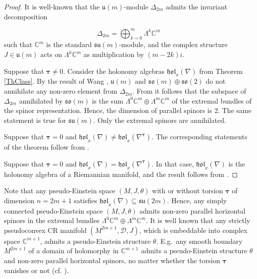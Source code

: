 \documentclass{amsart}
\theoremstyle{plain}
\theoremstyle{definition}
\def\so{\mathfrak{so}}
\def\su{\mathfrak{su}}
\def\u{\mathfrak{u}}
\newcommand{\hol}{\mathfrak{hol}}
\newcommand{\bt}{{\boldsymbol{\tau}}}
\newcommand{\Co}{\mathbb{C}}
\newcommand{\1}{\mathbf{1}}
\newcommand{\+}{\oplus}
\begin{document}
\begin{proof} 
It is well-known that the $\u(m)$-module $\Delta_{2m}$ admits the invariant decomposition 

\begin{equation}\label{Delta2n}\Delta_{2m}=\bigoplus_{k=0}^m\Lambda^k\Co^m\end{equation}
such that $\Co^m$ is the standard $\su(m)$-module, and the complex structure $J\in\u(m)$ acts on $\Lambda^k\Co^m$
as multiplication by $(m-2k)i$.

Suppose that $\bt\neq 0$. Consider the holonomy algebras $\hol_x(\nabla)$  from Theorem \ref{ThClass}. 
By the result of Wang \cite{Wang}, $\u(m)$ and $\so(m)\oplus\so(2)$ do not annihilate any non-zero element from $\Delta_{2m}$. 
From \cite[Lemma 5]{GalHolK} it follows that   the subspace of $\Delta_{2m}$   annihilated by $\so(m)$ is 
the sum $\Lambda^0\Co^m\oplus \Lambda^m\Co^m$ of the extremal bundles of the spinor representation. Hence, the dimension of parallel
spinors is 2. The same statement is true for $\su(m)$. Only the extremal spinors are annihilated. 

Suppose that $\bt=0$ and  $\hol_x(\nabla)\neq\hol_x(\nabla^\bt)$. The corresponding statements of the theorem follow  
from \cite[Theorem 8]{GalHolK}.

Suppose that $\bt=0$ and  $\hol_x(\nabla)=\hol_x(\nabla^\bt)$. In that case,  
$\hol_x(\nabla)$ is the holonomy algebra of  a Riemannian manifold, and the result follows from \cite{Wang}.
\end{proof}



Note that any pseudo-Einstein space $(M,J,\theta)$ with or without torsion 
$\bt$ of dimension $n=2m+1$ satisfies $\hol_x(\nabla)\subseteq \su(2m)$.
Hence, any  simply connected pseudo-Einstein space $(M,J,\theta)$ admits 
non-zero parallel horizontal spinors in the extremal bundles
$\Lambda^0\Co^m\oplus \Lambda^m\Co^m$. It is well known that any strictly 
pseudoconvex CR manifold $(M^{2m+1},\mathcal{D},J)$,
which is embeddable into complex space $\Co^{m+1}$, admits a pseudo-Einstein 
structure $\theta$. E.g.~any smooth boundary $M^{2m+1}$ of a domain of holomorphy 
in  $\Co^{m+1}$ admits a pseudo-Einstein structure $\theta$ and non-zero parallel
horizontal spinors, no matter whether the torsion $\bt$ vanishes or not (cf. \cite{Leitner18}).
 
\end{document}
